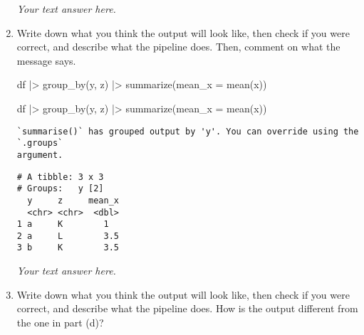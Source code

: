 \documentclass[
  letterpaper,
  DIV=11,
  numbers=noendperiod]{scrreprt}
\newenvironment{Shaded}{\begin{snugshade}}{\end{snugshade}}
\newcommand{\AttributeTok}[1]{\textcolor[rgb]{0.40,0.45,0.13}{#1}}
\newcommand{\FunctionTok}[1]{\textcolor[rgb]{0.28,0.35,0.67}{#1}}
\newcommand{\NormalTok}[1]{\textcolor[rgb]{0.00,0.23,0.31}{#1}}
\newcommand{\SpecialCharTok}[1]{\textcolor[rgb]{0.37,0.37,0.37}{#1}}
\begin{document}
\begin{enumerate}
\begin{tcolorbox}
  \emph{Your text answer here.}

  \end{tcolorbox}
\item
  Write down what you think the output will look like, then check if you
  were correct, and describe what the pipeline does. Then, comment on
  what the message says.

\begin{Shaded}
\begin{Highlighting}[]
\NormalTok{df }\SpecialCharTok{|\textgreater{}}
  \FunctionTok{group\_by}\NormalTok{(y, z) }\SpecialCharTok{|\textgreater{}}
  \FunctionTok{summarize}\NormalTok{(}\AttributeTok{mean\_x =} \FunctionTok{mean}\NormalTok{(x))}
\end{Highlighting}
\end{Shaded}

  \begin{tcolorbox}[enhanced jigsaw, left=2mm, rightrule=.15mm, bottomtitle=1mm, opacitybacktitle=0.6, leftrule=.75mm, opacityback=0, colframe=quarto-callout-note-color-frame, bottomrule=.15mm, coltitle=black, toptitle=1mm, colback=white, titlerule=0mm, colbacktitle=quarto-callout-note-color!10!white, title={Answer}, toprule=.15mm, breakable, arc=.35mm]

\begin{Shaded}
\begin{Highlighting}[]
\NormalTok{df }\SpecialCharTok{|\textgreater{}}
  \FunctionTok{group\_by}\NormalTok{(y, z) }\SpecialCharTok{|\textgreater{}}
  \FunctionTok{summarize}\NormalTok{(}\AttributeTok{mean\_x =} \FunctionTok{mean}\NormalTok{(x))}
\end{Highlighting}
\end{Shaded}

\begin{verbatim}
`summarise()` has grouped output by 'y'. You can override using the `.groups`
argument.
\end{verbatim}

\begin{verbatim}
# A tibble: 3 x 3
# Groups:   y [2]
  y     z     mean_x
  <chr> <chr>  <dbl>
1 a     K        1  
2 a     L        3.5
3 b     K        3.5
\end{verbatim}

  \emph{Your text answer here.}

  \end{tcolorbox}
\item
  Write down what you think the output will look like, then check if you
  were correct, and describe what the pipeline does. How is the output
  different from the one in part (d)?


\end{enumerate}
\end{document}
